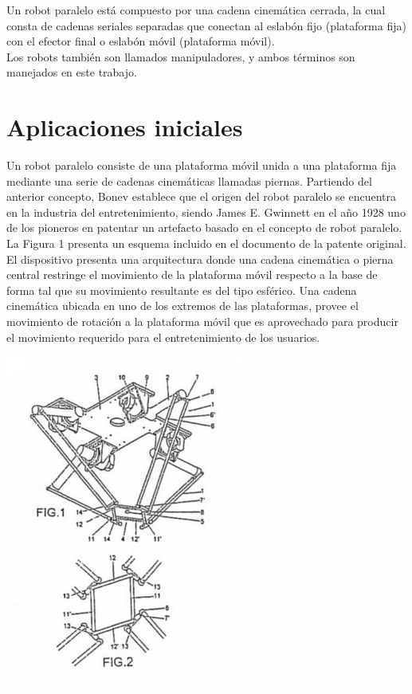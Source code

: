 \documentclass[11pt,a4paper,oldfontcommands,oneside]{memoir}
\begin{document}
Un robot paralelo está compuesto por una cadena cinemática cerrada, la cual consta de cadenas seriales separadas que conectan al eslabón fijo (plataforma fija) con el efector final o eslabón móvil (plataforma móvil).\\

Los robots también son llamados manipuladores, y ambos términos son manejados en este trabajo.\\

\section{Aplicaciones iniciales}
Un robot paralelo consiste de una plataforma móvil unida a una plataforma fija mediante una serie de cadenas cinemáticas llamadas piernas. Partiendo del anterior concepto, Bonev establece que el origen del robot paralelo se encuentra en la industria del entretenimiento, siendo James E. Gwinnett en el año 1928 uno de los pioneros en patentar un artefacto basado en el concepto de robot paralelo. La Figura 1 presenta un esquema incluido en el documento de la patente original. \\

El dispositivo presenta una arquitectura donde una cadena cinemática o pierna central restringe el movimiento de la plataforma móvil respecto a la base de forma tal que su movimiento resultante es del tipo esférico. Una cadena cinemática ubicada en uno de los extremos de las plataformas, provee el movimiento de rotación a la plataforma móvil que es aprovechado para producir el movimiento requerido para el entretenimiento de los usuarios.\\

\begin{center}
\includegraphics[width=8cm]{5.jpg}
\end{center}
\end{document}

